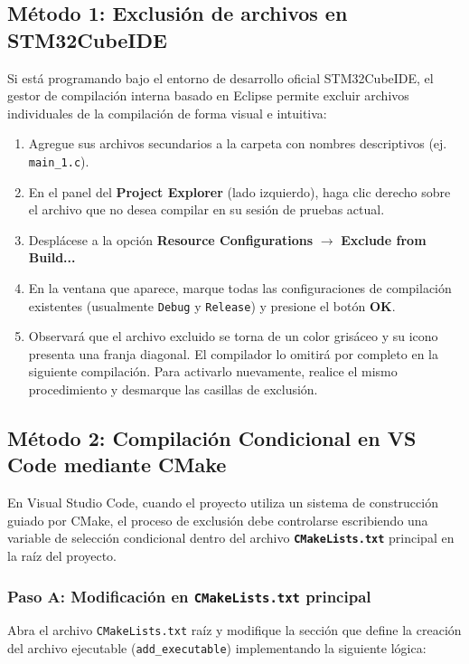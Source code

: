 \documentclass[
10pt, %
a4paper, %
oneside, %
headinclude,footinclude, %
BCOR5mm, %
]{scrartcl}
\begin{document}
\subsection{Método 1: Exclusión de archivos en STM32CubeIDE}
Si está programando bajo el entorno de desarrollo oficial STM32CubeIDE, el gestor de compilación interna basado en Eclipse permite excluir archivos individuales de la compilación de forma visual e intuitiva:
\begin{enumerate}
	\item Agregue sus archivos secundarios a la carpeta  con nombres descriptivos (ej. \texttt{main\_1.c}).
	\item En el panel del \textbf{Project Explorer} (lado izquierdo), haga clic derecho sobre el archivo que no desea compilar en su sesión de pruebas actual.
	\item Desplácese a la opción \textbf{Resource Configurations} $\rightarrow$ \textbf{Exclude from Build...}
	\item En la ventana que aparece, marque todas las configuraciones de compilación existentes (usualmente \texttt{Debug} y \texttt{Release}) y presione el botón \textbf{OK}.
	\item Observará que el archivo excluido se torna de un color grisáceo y su icono presenta una franja diagonal. El compilador lo omitirá por completo en la siguiente compilación. Para activarlo nuevamente, realice el mismo procedimiento y desmarque las casillas de exclusión.
\end{enumerate}

\subsection{Método 2: Compilación Condicional en VS Code mediante CMake}
En Visual Studio Code, cuando el proyecto utiliza un sistema de construcción guiado por CMake, el proceso de exclusión debe controlarse escribiendo una variable de selección condicional dentro del archivo \textbf{\texttt{CMakeLists.txt}} principal en la raíz del proyecto.

\subsubsection{Paso A: Modificación en \texttt{CMakeLists.txt} principal}
Abra el archivo \texttt{CMakeLists.txt} raíz y modifique la sección que define la creación del archivo ejecutable (\texttt{add\_executable}) implementando la siguiente lógica:
\end{document}
